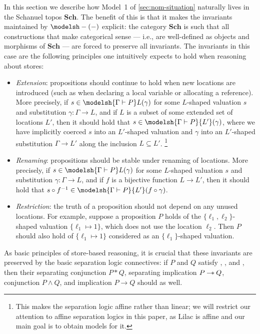\documentclass[
  sigconf,
  screen, ]{acmart}
\makeatletter
\theoremstyle{definition}
\newcommand{\labelword}[2]{\phantomsection
  #1\def\@currentlabel{\unexpanded{#1}}\label{#2}}
\newcommand\nref[2]{\hyperref[#1]{#2}} \newcommand\checkhigh{{\huge{\color{red}\textbf{TODO: check}}}}
\newcommand\Sch{{\nref{def:Sch}{\mathbf{Sch}}}}
\newcommand\sepcon{\mathbin{*}}
\newcommand\sepimp{\mathbin{-\mkern-2mu*}}
\makeatother
\begin{document}
In this section we describe how
Model~1
of \cref{sec:nom-situation}
naturally lives in the Schanuel topos $\Sch$.
The benefit of this
is that it makes the invariants
maintained by 
$\modelsh-{(-)}$
explicit: the category $\Sch$
is such that all
constructions that make categorical sense --- i.e.,
are well-defined as objects and morphisms of $\Sch$ ---
are forced to preserve all invariants.
The invariants in this case
are the following principles
one intuitively expects to hold
when reasoning about stores:
\begin{itemize}[leftmargin=*]
  \item \emph{\labelword{Extension}{def:Extension}}:
    propositions should continue to hold
    when new locations are introduced (such as
    when declaring a local variable or allocating a reference).
    More precisely, if
    $s\in\modelsh{\Gamma\vdash P}L(\gamma)$
    for some $L$-shaped valuation $s$
    and substitution $\gamma : \Gamma\to L$,
    and if $L$ is a subset of some extended set of locations $L'$,
    then it should hold that
    $s\in\modelsh{\Gamma\vdash P}{L'}(\gamma)$,
    where we have implicitly coerced $s$
    into an $L'$-shaped valuation
    and $\gamma$ into an $L'$-shaped substitution $\Gamma\to L'$
    along the inclusion $L\subseteq L'$.
    \footnote{This makes the separation logic affine
    rather than linear; we will restrict our attention to affine separation logics in this paper,
    as Lilac is affine and our main goal is to obtain models for it.}
  \item \emph{\labelword{Renaming}{def:Renaming}}: propositions should be 
    stable under renaming of locations.
    More precisely, if $s\in\modelsh{\Gamma\vdash P}L(\gamma)$
    for some $L$-shaped valuation $s$
    and substitution $\gamma : \Gamma\to L$,
    and if $f$ is a bijective function $L\to L'$,
    then it should hold that
    $s\circ f^{-1}\in\modelsh{\Gamma\vdash P}{L'}(f\circ \gamma)$.
  \item \emph{\labelword{Restriction}{def:Restriction}}: the truth of a proposition
    should not depend on any unused locations.
    For example, suppose a proposition $P$ 
    holds of the $\{\ell_1,\ell_2\}$-shaped valuation $\{\ell_1\mapsto 1\}$,
    which does not use the location $\ell_2$.
    Then $P$ should also hold of
    $\{\ell_1\mapsto 1\}$ considered as an $\{\ell_1\}$-shaped valuation.
\end{itemize}
As basic principles of
store-based reasoning, it is crucial
that these invariants are preserved by the
basic separation logic connectives:
if $P$ and $Q$ satisfy \Extension{}, \Renaming{}, and \Restriction{},
then their separating conjunction $P\sepcon Q$,
separating implication $P\sepimp Q$,
conjunction $P\land Q$, and implication $P\to Q$
should as well.
\end{document}
